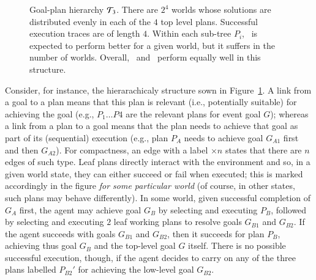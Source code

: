\begin{figure}[t]
\begin{center}

\end{center}
\caption{Goal-plan hierarchy ${\mathcal{T}}_3$. There are $2^4$ worlds whose solutions are
distributed evenly in each of the $4$ top level plans. Successful execution
traces are of length $4$. Within each sub-tree $P_i$, \BUL\ is expected to
perform better for a given world, but it suffers in the number of worlds. Overall, \CL\ and \BUL\
perform equally well in this structure.}
\label{fig:T3}
\end{figure}


Consider, for instance, the hierarachicaly structure sown in Figure~\ref{fig:T3}.
A link from a goal to a plan means that this plan is relevant (i.e., potentially
suitable) for achieving the goal (e.g., $P_1 \ldots P4$ are the relevant plans
for event goal $G$); whereas a link from a plan to a goal means that the plan
needs to achieve that goal as part of its (sequential) execution (e.g., plan
$P_A$ needs to achieve goal $G_{A1}$ first and then $G_{A2}$).
For compactness, an edge with a label $\times n$ states that there are $n$ edges
of such type.
Leaf plans directly interact with the environment and so, in a given world state,
they can either succeed or fail when executed; this is marked accordingly in the
figure \emph{for some particular world} (of course, in other states, such plans
may behave differently).
In some world, given successful completion of $G_A$ first, the agent may achieve
goal $G_B$ by selecting and executing $P_B$, followed by selecting and executing
$2$ leaf working plans to resolve goals $G_{B1}$ and $G_{B2}$. If the agent
succeeds with goals $G_{B1}$ and $G_{B2}$, then it succeeds for plan $P_B$,
achieving thus goal $G_B$ and the top-level goal $G$ itself. There is no possible
successful execution, though, if the agent decides to carry on any of the three
plans labelled $P_{B2}'$ for achieving the low-level goal $G_{B2}$.





